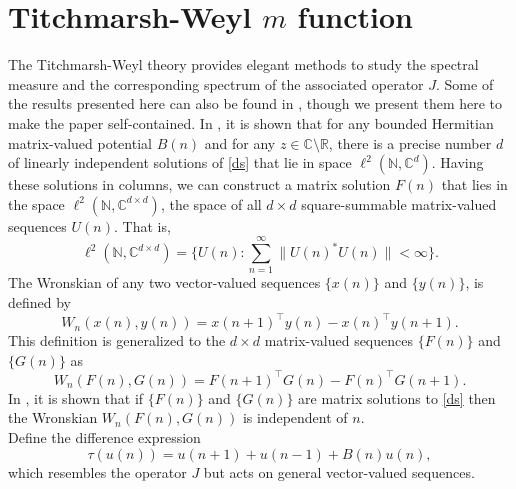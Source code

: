\documentclass[reqno]{amsart}
\numberwithin{equation}{section}
\newcommand{\C}{\mathbb{C}}
\newcommand{\R}{\mathbb{R}}
\newcommand{\N}{\mathbb{N}}
\begin{document}
     

\section{Titchmarsh-Weyl $m$ function}


The Titchmarsh-Weyl theory provides elegant methods to study the spectral measure and the corresponding spectrum of the associated operator $J$. Some of the results presented here can also be found in \cite{KA2, KM}, though we present them here to make the paper self-contained.  In \cite{KA2}, it is shown that for any bounded Hermitian matrix-valued potential $B(n)$  and for any $z\in \C\setminus\R$, there is a precise number $d$ of linearly independent solutions of \eqref{ds} that lie in space $\ell^2(\N, \C^d)$. Having these solutions in columns, we can construct a matrix solution $F(n)$ that lies in the space $\ell^2(\N, \C^{d\times d} )$, the space of all  $d\times d $  square-summable matrix-valued sequences $U(n)$.
That is, \[
\ell^2(\N, \C^{d\times d} ) = \Big \{ U(n) : \sum_{n=1}^{\infty}\|U(n)^* U(n)\| < \infty  \Big \}.
\]
The Wronskian of any two vector-valued sequences $\{x(n)\}$ and $\{y(n)\}$, is defined by
\begin{equation}
W_n(x(n), y(n)) = x(n+1)^\top y(n) - x(n)^\top y(n+1).
\end{equation} This definition is generalized to the $d \times d$ matrix-valued sequences $\{F(n)\}$ and $\{G(n)\}$ as 
\begin{equation}
W_n(F(n), G(n)) =   F(n+1)^\top G(n) - F(n)^\top G(n+1).
\end{equation}
 In \cite{KM}, it is shown that if $\{F(n)\}$ and $\{G(n)\}$ are matrix solutions to \eqref{ds} then the Wronskian $W_n(F(n), G(n))$ is independent of $n.$\\
Define the difference expression
\[
\tau(u(n)) = u(n + 1) + u(n - 1) + B(n)u(n), 
\]  
which resembles the operator \( J \) but acts on general vector-valued sequences.
\medskip
\end{document}
